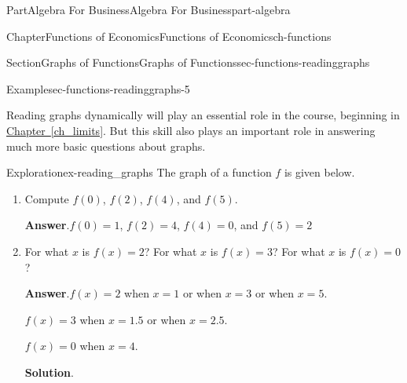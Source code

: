 \documentclass{tufte-book}
\newcommand{\blocktitlefont}{\relax}
\newcommand{\xreffont}{\relax}
\numberwithin{equation}{chapter}
\begin{document}
\begin{partptx}{Part}{Algebra For Business}{}{Algebra For Business}{}{}{part-algebra}
\begin{chapterptx}{Chapter}{Functions of Economics}{}{Functions of Economics}{}{}{ch-functions}
\begin{sectionptx}{Section}{Graphs of Functions}{}{Graphs of Functions}{}{}{sec-functions-readinggraphs}
\begin{example}{Example}{}{sec-functions-readinggraphs-5}
\begin{image}{0}{1}{0}{}
{\begin{tikzpicture}
\end{tikzpicture}
}%
\end{image}%
\end{example}
Reading graphs dynamically will play an essential role in the course, beginning in \hyperref[ch_limits]{Chapter~{\xreffont\ref{ch_limits}}}. But this skill also plays an important role in answering much more basic questions about graphs.%
\begin{exploration}{Exploration}{}{ex-reading_graphs}%
The graph of a function \(f\) is given below.%
\begin{image}{0.25}{0.5}{0.25}{}%
%
\end{image}%
\begin{enumerate}[font=\bfseries,label=(\alph*),ref=\alph*]%
\item{}Compute \(f(0)\), \(f(2)\), \(f(4)\), and \(f(5)\).%
\par\smallskip%
\noindent\textbf{\blocktitlefont Answer}.\hypertarget{ex-reading_graphs-2-2}{}\quad{}\(f(0)=1\), \(f(2)=4\), \(f(4)=0\), and \(f(5)=2\)%
\item{}For what \(x\) is \(f(x)=2\)?  For what  \(x\) is \(f(x)=3\)? For what  \(x\) is \(f(x)=0\)?%
\par\smallskip%
\noindent\textbf{\blocktitlefont Answer}.\hypertarget{ex-reading_graphs-3-2}{}\quad{}\(f(x)=2\) when \(x=1\) or when \(x=3\) or when \(x=5\).%
\par
\(f(x)=3\) when \(x=1.5\) or when \(x=2.5\).%
\par
\(f(x)=0\) when \(x=4\).%
\par\smallskip%
\noindent\textbf{\blocktitlefont Solution}.\hypertarget{ex-reading_graphs-3-3}{}\quad{}\begin{image}{0.25}{0.5}{0.25}{}%

\end{image}
\end{enumerate}
\end{exploration}
\end{sectionptx}
\end{chapterptx}
\end{partptx}
\end{document}
